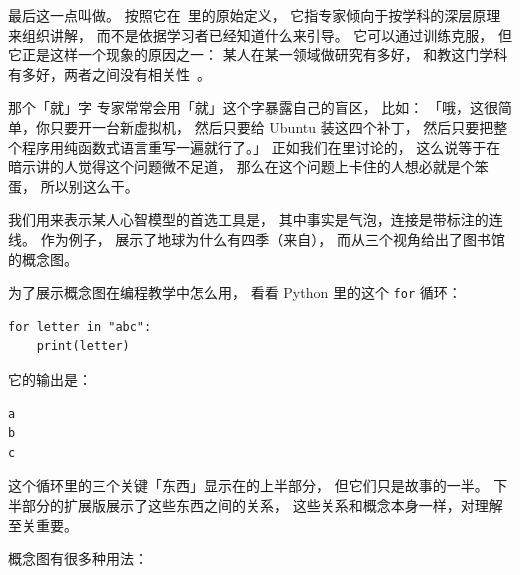 最后这一点叫做。
按照它在~\cite{Nath2003}里的原始定义，
它指专家倾向于按学科的深层原理来组织讲解，
而不是依据学习者已经知道什么来引导。
它可以通过训练克服，
但它正是这样一个现象的原因之一：
某人在某一领域做研究有多好，
和教这门学科有多好，两者之间没有相关性~\cite{Mars2002}。

\begin{aside}{那个「就」字}
  专家常常会用「就」这个字暴露自己的盲区，
  比如：
  「哦，这很简单，你只要开一台新虚拟机，
  然后只要给 Ubuntu 装这四个补丁，
  然后只要把整个程序用纯函数式语言重写一遍就行了。」
  正如我们在里讨论的，
  这么说等于在暗示讲的人觉得这个问题微不足道，
  那么在这个问题上卡住的人想必就是个笨蛋，
  所以别这么干。
\end{aside}


我们用来表示某人心智模型的首选工具是，
其中事实是气泡，连接是带标注的连线。
作为例子，
展示了地球为什么有四季（来自），
而从三个视角给出了图书馆的概念图。


为了展示概念图在编程教学中怎么用，
看看 Python 里的这个 \texttt{for} 循环：

\begin{verbatim}
for letter in "abc":
    print(letter)
\end{verbatim}

\noindent
它的输出是：

\begin{verbatim}
a
b
c
\end{verbatim}

这个循环里的三个关键「东西」显示在的上半部分，
但它们只是故事的一半。
下半部分的扩展版展示了这些东西之间的关系，
这些关系和概念本身一样，对理解至关重要。


\newpage
概念图有很多种用法：

